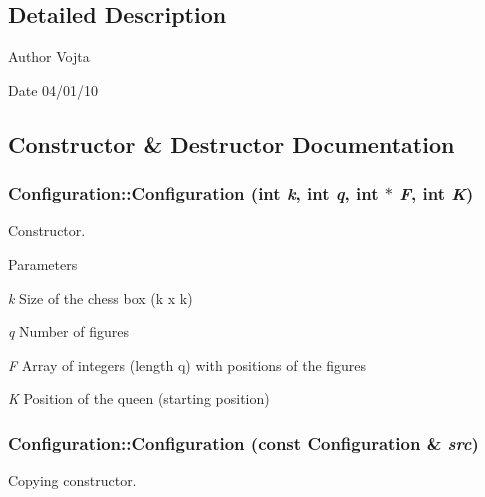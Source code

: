 \subsection{Detailed Description}
\begin{DoxyAuthor}{Author}
Vojta 
\end{DoxyAuthor}
\begin{DoxyDate}{Date}
04/01/10 
\end{DoxyDate}


\subsection{Constructor \& Destructor Documentation}
\hypertarget{class_configuration_a341c35d408954b68b37a533df2953b9a}{
\subsubsection[{Configuration}]{\setlength{\rightskip}{0pt plus 5cm}Configuration::Configuration (int {\em k}, \/  int {\em q}, \/  int $\ast$ {\em F}, \/  int {\em K})}}
\label{class_configuration_a341c35d408954b68b37a533df2953b9a}


Constructor. 


\begin{DoxyParams}{Parameters}
\item[{\em k}]Size of the chess box (k x k) \item[{\em q}]Number of figures \item[{\em F}]Array of integers (length q) with positions of the figures \item[{\em K}]Position of the queen (starting position) \end{DoxyParams}
\hypertarget{class_configuration_a8fb945e5f8e16521556b7d440f1fa69a}{
\subsubsection[{Configuration}]{\setlength{\rightskip}{0pt plus 5cm}Configuration::Configuration (const {\bf Configuration} \& {\em src})}}
\label{class_configuration_a8fb945e5f8e16521556b7d440f1fa69a}


Copying constructor. 


